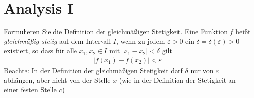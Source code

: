 \documentclass[a6paper,11pt,print
,grid=both
]{kartei}
\begin{document}

{\Large

	\section*{Analysis I}
	\setcounter{section}{1}



	\begin{karte}{Formulieren Sie die Definition der gleichmäßigen Stetigkeit.}
		Eine Funktion $f$ heißt \emph{gleichmäßig stetig} auf dem Intervall $I$, wenn zu jedem $\varepsilon > 0$ ein $\delta = \delta(\varepsilon) > 0$ existiert, so dass für alle $x_1,x_2 \in I$ mit $\lvert x_1 - x_2 \rvert < \delta $ gilt
		\begin{align}
			\lvert f(x_1) - f(x_2) \rvert<\varepsilon
		\end{align}
		{\large
			Beachte: In der Definition der gleichmäßigen Stetigkeit darf $\delta$ nur von $\varepsilon$ abhängen, aber nicht von der Stelle $x$ (wie in der Definition der Stetigkeit an einer festen Stelle $c$)
		}
	\end{karte}



	
	
	
	
	
	
	
	






}
\end{document}
